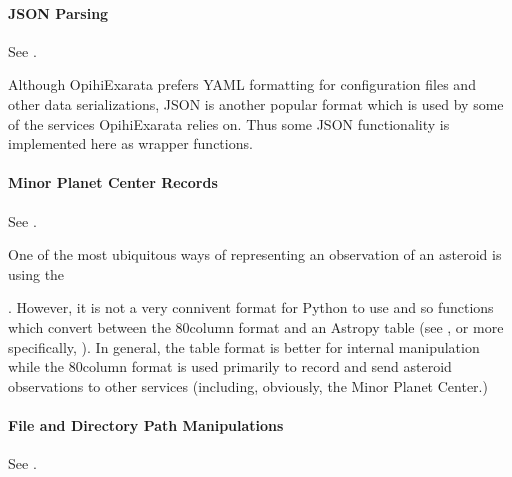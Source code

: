 \documentclass[letterpaper,11pt,english]{sphinxmanual}
\begin{document}
\paragraph{JSON Parsing}
\label{\detokenize{technical/architecture/library:json-parsing}}
\sphinxAtStartPar
See {\hyperref[\detokenize{code/opihiexarata.library.json:module-opihiexarata.library.json}]{}}.

\sphinxAtStartPar
Although OpihiExarata prefers YAML formatting for configuration files and
other data serializations, JSON is another popular format which is used by
some of the services OpihiExarata relies on. Thus some JSON functionality
is implemented here as wrapper functions.


\paragraph{Minor Planet Center Records}
\label{\detokenize{technical/architecture/library:minor-planet-center-records}}
\sphinxAtStartPar
See {\hyperref[\detokenize{code/opihiexarata.library.mpcrecord:module-opihiexarata.library.mpcrecord}]{}}.

\sphinxAtStartPar
One of the most ubiquitous ways of representing an observation of an asteroid
is using the
%
\begin{footnote}[51]\sphinxAtStartFootnote
{}
%
\end{footnote}.
However, it is not a very connivent format for Python to use and so
functions which convert between the 80\sphinxhyphen{}column format and an Astropy table
(see , or more specifically,
). In general, the table format is better for
internal manipulation while the 80\sphinxhyphen{}column format is used primarily to record
and send asteroid observations to other services (including, obviously, the
Minor Planet Center.)


\paragraph{File and Directory Path Manipulations}
\label{\detokenize{technical/architecture/library:file-and-directory-path-manipulations}}
\sphinxAtStartPar
See {\hyperref[\detokenize{code/opihiexarata.library.path:module-opihiexarata.library.path}]{}}.
\end{document}
